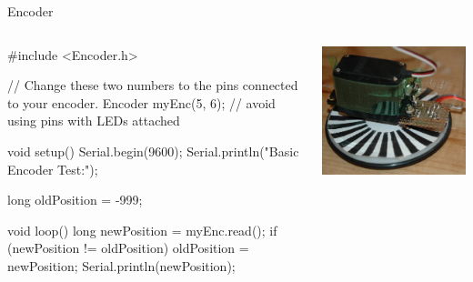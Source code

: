 \documentclass[compress]{beamer}
\begin{document}
\begin{frame}[fragile]{Encoder}
    \begin{columns}
        \begin{column}{0.7\linewidth}
\begin{cppcode}
#include <Encoder.h>

// Change these two numbers to the pins connected to your encoder.
Encoder myEnc(5, 6);
//   avoid using pins with LEDs attached

void setup() {
  Serial.begin(9600);
  Serial.println("Basic Encoder Test:");
}

long oldPosition  = -999;

void loop() {
  long newPosition = myEnc.read();
  if (newPosition != oldPosition) {
    oldPosition = newPosition;
    Serial.println(newPosition);
  }
}
\end{cppcode}

        \end{column}
        \begin{column}{0.3\linewidth}
            \begin{center}
                \includegraphics[width=\columnwidth]{encoders3}
            \end{center}
        \end{column}
    \end{columns}
\end{frame}
\end{document}
